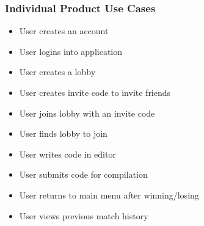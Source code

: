 \documentclass[12pt, titlepage]{article}
\begin{document}
\subsubsection{Individual Product Use Cases}
\begin{itemize} 
    \item{User creates an account}
    \item{User logins into application}
    \item{User creates a lobby}
    \item{User creates invite code to invite friends}
    \item{User joins lobby with an invite code}
    \item{User finds lobby to join}
    \item{User writes code in editor}
    \item{User submits code for compilation}
    \item{User returns to main menu after winning/losing}
    \item{User views previous match history}
\end{itemize}
\end{document}
